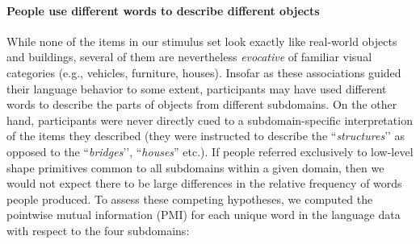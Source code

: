 \documentclass[10pt,letterpaper]{article}
\begin{document}






\paragraph{People use different words to describe different objects} %

While none of the items in our stimulus set look exactly like real-world objects and buildings, several of them are nevertheless \textit{evocative} of familiar visual categories (e.g., vehicles, furniture, houses).
Insofar as these associations guided their language behavior to some extent, participants may have used different words to describe the parts of objects from different subdomains. 
On the other hand, participants were never directly cued to a subdomain-specific interpretation of the items they described (they were instructed to describe the ``\textit{structures}’’ as opposed to the ``\textit{bridges}’’, ``\textit{houses}'' etc.).
If people referred exclusively to low-level shape primitives common to all subdomains within a given domain, then we would not expect there to be large differences in the relative frequency of words people produced. 
To assess these competing hypotheses, we computed the pointwise mutual information (PMI) for each unique word in the language data with respect to the four subdomains:
\end{document}
